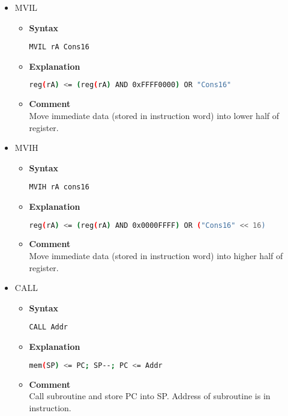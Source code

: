 \begin{itemize}
    \item MVIL
    \begin{itemize}
        \item \textbf{Syntax}
        \begin{lstlisting}[language={[x86masm]Assembler}, frame=single]
    MVIL rA Cons16
        \end{lstlisting}
        \item \textbf{Explanation}
        \begin{lstlisting}[language=bash, frame=single]
    reg(rA) <= (reg(rA) AND 0xFFFF0000) OR "Cons16"
        \end{lstlisting}
        \item \textbf{Comment} \\
    Move immediate data (stored in instruction word) into lower half of register.
    \end{itemize}

    \item MVIH
    \begin{itemize}
        \item \textbf{Syntax}
        \begin{lstlisting}[language={[x86masm]Assembler}, frame=single]
    MVIH rA cons16
        \end{lstlisting}
        \item \textbf{Explanation}
        \begin{lstlisting}[language=bash, frame=single]
    reg(rA) <= (reg(rA) AND 0x0000FFFF) OR ("Cons16" << 16)
        \end{lstlisting}
        \item \textbf{Comment} \\
    Move immediate data (stored in instruction word) into higher half of register.
    \end{itemize}

    \item CALL
    \begin{itemize}
        \item \textbf{Syntax}
        \begin{lstlisting}[language={[x86masm]Assembler}, frame=single]
    CALL Addr
        \end{lstlisting}
        \item \textbf{Explanation}
        \begin{lstlisting}[language=bash, frame=single]
    mem(SP) <= PC; SP--; PC <= Addr
        \end{lstlisting}
        \item \textbf{Comment} \\
    Call subroutine and store PC into SP. Address of subroutine is in instruction.
    \end{itemize}


\end{itemize}
